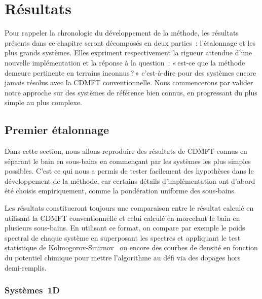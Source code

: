 \chapter{Résultats} \label{chap: resultats}

Pour rappeler la chronologie du développement de la méthode, les résultats
présents dans ce chapitre seront décomposés en deux parties~: l'étalonnage et
les plus grands systèmes. Elles expriment respectivement la rigueur attendue
d'une nouvelle implémentation et la réponse à la question~: «\,est-ce que la
méthode demeure pertinente en terrains inconnus\,?\,» c'est-à-dire pour des
systèmes encore jamais résolus avec la CDMFT conventionnelle. Nous commencerons
par valider notre approche sur des systèmes de référence bien connus, en
progressant du plus simple au plus complexe.

\section{Premier étalonnage} \label{sec: etalonnage}

Dans cette section, nous allons reproduire des résultats de CDMFT connus en
séparant le bain en sous-bains en commençant par les systèmes les plus simples
possibles. C'est ce qui nous a permis de tester facilement des hypothèses dans
le développement de la méthode, car certains détails d'implémentation ont
d'abord été choisis empiriquement, comme la pondération uniforme des sous-bains.

Les résultats constitueront toujours une comparaison entre le résultat calculé
en utilisant la CDMFT conventionnelle et celui calculé en morcelant le bain en
plusieurs sous-bains. En utilisant ce format, on compare par exemple le poids
spectral de chaque système en superposant les spectres et appliquant le test
statistique de Kolmogorov-Smirnov~\cite{massey1951kolmogorov} ou encore des
courbes de densité en fonction du potentiel chimique pour mettre l'algorithme au
défi via des dopages hors demi-remplis.

\subsection{Systèmes~1D}

